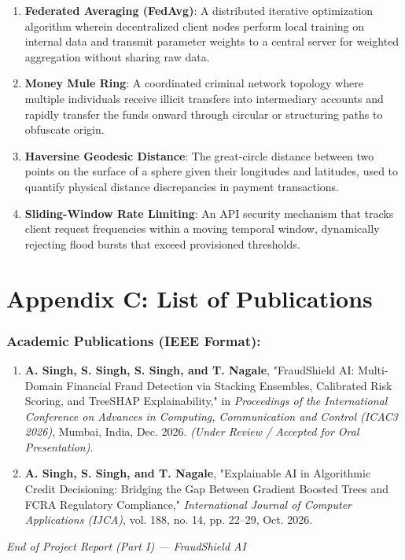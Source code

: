 \documentclass[12pt,a4paper,oneside]{report}
\begin{document}
\begin{enumerate}[leftmargin=0.35in]
\item \textbf{Federated Averaging (FedAvg)}: A distributed iterative optimization algorithm wherein decentralized client nodes perform local training on internal data and transmit parameter weights to a central server for weighted aggregation without sharing raw data.
\item \textbf{Money Mule Ring}: A coordinated criminal network topology where multiple individuals receive illicit transfers into intermediary accounts and rapidly transfer the funds onward through circular or structuring paths to obfuscate origin.
\item \textbf{Haversine Geodesic Distance}: The great-circle distance between two points on the surface of a sphere given their longitudes and latitudes, used to quantify physical distance discrepancies in payment transactions.
\item \textbf{Sliding-Window Rate Limiting}: An API security mechanism that tracks client request frequencies within a moving temporal window, dynamically rejecting flood bursts that exceed provisioned thresholds.
\end{enumerate}

\newpage


\chapter*{Appendix C: List of Publications}

\subsection{Academic Publications (IEEE Format):}

\begin{enumerate}[leftmargin=0.35in]
\item \textbf{A. Singh, S. Singh, S. Singh, and T. Nagale}, "FraudShield AI: Multi-Domain Financial Fraud Detection via Stacking Ensembles, Calibrated Risk Scoring, and TreeSHAP Explainability," in \textit{Proceedings of the International Conference on Advances in Computing, Communication and Control (ICAC3 2026)}, Mumbai, India, Dec. 2026. \textit{(Under Review / Accepted for Oral Presentation)}.
\item \textbf{A. Singh, S. Singh, and T. Nagale}, "Explainable AI in Algorithmic Credit Decisioning: Bridging the Gap Between Gradient Boosted Trees and FCRA Regulatory Compliance," \textit{International Journal of Computer Applications (IJCA)}, vol. 188, no. 14, pp. 22--29, Oct. 2026.
\end{enumerate}


\textit{End of Project Report (Part I) --- FraudShield AI}
\end{document}
